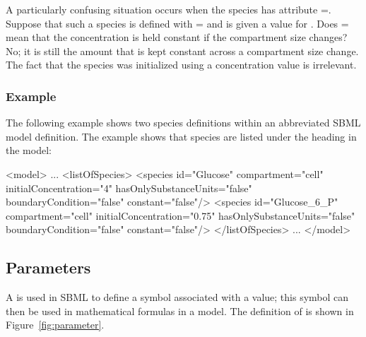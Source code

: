 A particularly confusing situation occurs when the species has
attribute =.  Suppose that such a
species is defined with =
and is given a value for .  Does
= mean that the concentration is held
constant if the compartment size changes?  No; it is still the
amount that is kept constant across a compartment size change.
The fact that the species was initialized using a concentration
value is irrelevant.


\subsubsection{Example}

The following example shows two species definitions within an
abbreviated SBML model definition.  The example shows that species
are listed under the heading  in the model:

\begin{example}
<model>
    ...
    <listOfSpecies>
        <species id="Glucose" compartment="cell" initialConcentration="4"
                 hasOnlySubstanceUnits="false" boundaryCondition="false" 
                 constant="false"/>
        <species id="Glucose_6_P" compartment="cell" initialConcentration="0.75"
                 hasOnlySubstanceUnits="false" boundaryCondition="false" 
                 constant="false"/>
    </listOfSpecies>
    ...
</model>
\end{example}


\subsection{Parameters}
\label{sec:parameters}

A \Parameter is used in SBML to define a symbol associated with a
value; this symbol can then be used in mathematical formulas in a
model. The definition of
\Parameter is shown in Figure~\vref{fig:parameter}.

